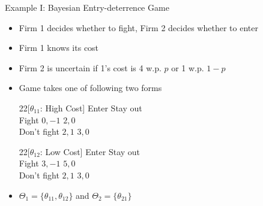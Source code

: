 \documentclass[11pt,aspectratio=169,handout]{beamer}
\begin{document}
  
  \begin{frame}{Example I: Bayesian Entry-deterrence Game}
   \begin{itemize}
    \item Firm 1 decides whether to fight, Firm 2 decides whether to enter
    \item Firm 1 knows its cost
    \item Firm 2 is uncertain if 1's cost is 4 w.p. $p$ or 1 w.p. $1-p$
    \item Game takes one of following two forms
    \vspace{1em}
    \begin{center} \scriptsize
     \begin{game}{2}{2}[$\theta_{11}$: High Cost]
      				\> Enter		\>	Stay out	\\
      Fight			\> $0, -1$	\>	$2, 0$	\\
      Don't fight	\> $2, 1$	\>	$3, 0$
     \end{game}\hspace{2cm}
     \begin{game}{2}{2}[$\theta_{12}$: Low Cost]
      				\> Enter		\>	Stay out	\\
      Fight			\> $3, -1$	\>	$5, 0$	\\
      Don't fight	\> $2, 1$	\>	$3, 0$
     \end{game}
    \end{center}
    \vspace{1em}
    \item $\Theta_1 = \{\theta_{11}, \theta_{12}\}$ and $\Theta_2 = \{\theta_{21}\}$
   \end{itemize}  
  \end{frame}
  
\end{document}
